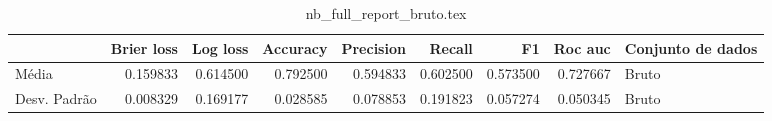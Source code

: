 \begin{table}
\centering
\caption{nb_full_report_bruto.tex}
\label{nb_full_report_bruto.tex}
\begin{tabular}{lrrrrrrrl}
\toprule
{} &  Brier  loss &  Log loss &  Accuracy  &  Precision  &   Recall  &       F1  &  Roc auc  & Conjunto de dados \\
\midrule
Média        &     0.159833 &  0.614500 &   0.792500 &    0.594833 &  0.602500 &  0.573500 &  0.727667 &             Bruto \\
Desv. Padrão &     0.008329 &  0.169177 &   0.028585 &    0.078853 &  0.191823 &  0.057274 &  0.050345 &             Bruto \\
\bottomrule
\end{tabular}
\end{table}
